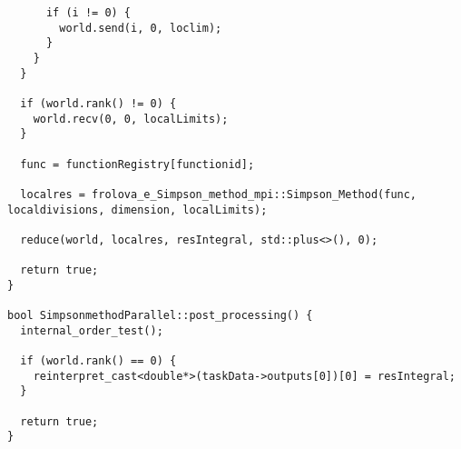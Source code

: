 \documentclass{report}
\begin{document}
\begin{lstlisting}
      if (i != 0) {
        world.send(i, 0, loclim);
      }
    }
  }

  if (world.rank() != 0) {
    world.recv(0, 0, localLimits);
  }

  func = functionRegistry[functionid];

  localres = frolova_e_Simpson_method_mpi::Simpson_Method(func, localdivisions, dimension, localLimits);

  reduce(world, localres, resIntegral, std::plus<>(), 0);

  return true;
}

bool SimpsonmethodParallel::post_processing() {
  internal_order_test();

  if (world.rank() == 0) {
    reinterpret_cast<double*>(taskData->outputs[0])[0] = resIntegral;
  }

  return true;
}
\end{lstlisting}
\end{document}
